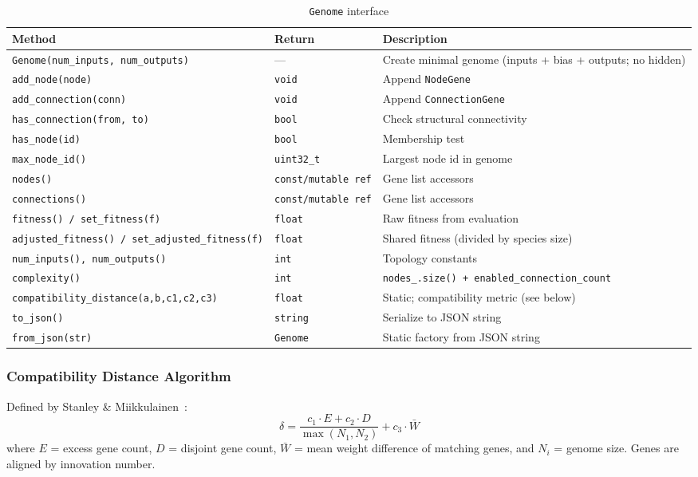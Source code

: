 \begin{table}[H]
\centering\small
\caption{\texttt{Genome} interface}
\begin{tabularx}{\textwidth}{@{}llX@{}}
\toprule
\textbf{Method} & \textbf{Return} & \textbf{Description} \\
\midrule
\texttt{Genome(num\_inputs, num\_outputs)} & — & Create minimal genome (inputs + bias + outputs; no hidden) \\
\texttt{add\_node(node)} & \texttt{void} & Append \texttt{NodeGene} \\
\texttt{add\_connection(conn)} & \texttt{void} & Append \texttt{ConnectionGene} \\
\texttt{has\_connection(from, to)} & \texttt{bool} & Check structural connectivity \\
\texttt{has\_node(id)} & \texttt{bool} & Membership test \\
\texttt{max\_node\_id()} & \texttt{uint32\_t} & Largest node id in genome \\
\texttt{nodes()} & \texttt{const/mutable ref} & Gene list accessors \\
\texttt{connections()} & \texttt{const/mutable ref} & Gene list accessors \\
\texttt{fitness() / set\_fitness(f)} & \texttt{float} & Raw fitness from evaluation \\
\texttt{adjusted\_fitness() / set\_adjusted\_fitness(f)} & \texttt{float} & Shared fitness (divided by species size) \\
\texttt{num\_inputs(), num\_outputs()} & \texttt{int} & Topology constants \\
\texttt{complexity()} & \texttt{int} & \texttt{nodes\_.size() + enabled\_connection\_count} \\
\texttt{compatibility\_distance(a,b,c1,c2,c3)} & \texttt{float} & Static; compatibility metric (see below) \\
\texttt{to\_json()} & \texttt{string} & Serialize to JSON string \\
\texttt{from\_json(str)} & \texttt{Genome} & Static factory from JSON string \\
\bottomrule
\end{tabularx}
\end{table}

\subsubsection{Compatibility Distance Algorithm}

Defined by Stanley \& Miikkulainen~\cite{stanley2002}:
\[
  \delta = \frac{c_1 \cdot E + c_2 \cdot D}{\max(N_1, N_2)} + c_3 \cdot \bar{W}
\]
where $E$ = excess gene count, $D$ = disjoint gene count, $\bar{W}$ = mean weight
difference of matching genes, and $N_i$ = genome size.  Genes are aligned by innovation
number.

